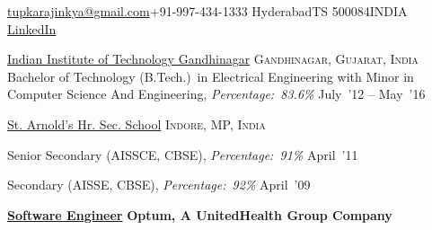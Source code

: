 \documentclass[10pt,a4paper]{article}
\begin{document}
\sloppy  %



\nobreakvspace{0.3em}  %

\noindent\href{mailto:tupkarajinkya@gmail.com}{tupkarajinkya\mbox{}@\mbox{}gmail.com}\sbull +91-997-434-1333\sbull
Hyderabad\sbull TS 500084\sbull INDIA
\sbull\href{https://www.linkedin.com/in/ajinkya-tupkar-jain-a9b55157/}{LinkedIn}
\spacedhrule{0.5em}{-0.4em}


\headedsection
  {\href{}{Indian Institute of Technology Gandhinagar}}
  {\textsc{Gandhinagar, Gujarat, India}} {%
  \headedsubsection
    {Bachelor of Technology (B.Tech.)~in Electrical Engineering with Minor in Computer Science And Engineering, \textit{Percentage:~83.6\%}}
    {July~'12 -- May~'16} {}
}

\headedsection
{\href{}{St. Arnold's Hr. Sec. School}}
{\textsc{Indore, MP, India}} {%
  \headedsubsection
  {Senior Secondary (AISSCE, CBSE), \textit{Percentage:~91\%}}
  {April~'11} {}

  \headedsubsection
  {Secondary (AISSE, CBSE), \textit{Percentage:~92\%}}
  {April~'09} {}
  
}

\spacedhrule{0.5em}{-0.4em}


\headedsection  %
  {\href{}{\textbf{Software Engineer}}}
  {\textbf{Optum, A UnitedHealth Group Company}}
\end{document}
